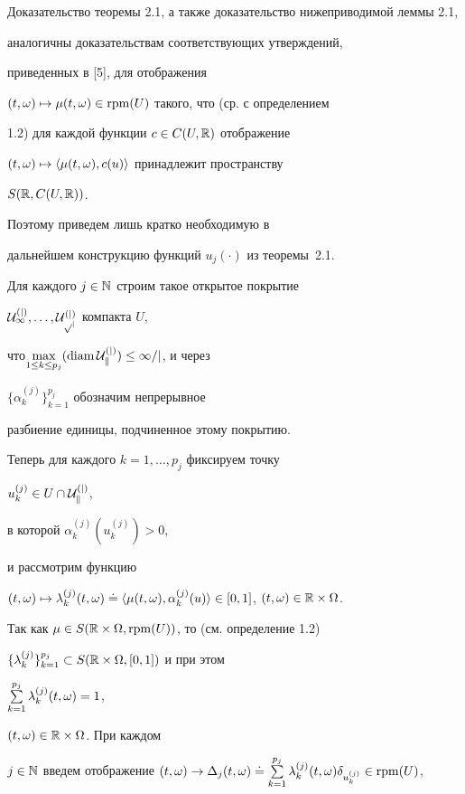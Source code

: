 Доказательство теоремы 2.1, а также доказательство нижеприводимой леммы 2.1,


аналогичны доказательствам соответствующих утверждений,


приведенных в [5], для отображения


$(t,\omega)\mapsto\mu(t,\omega)\in\operatorname{rpm}(U)$ такого, что (ср. с определением


1.2) для каждой функции $c\in C(U,\Bbb R)$ отображение


$(t,\omega)\mapsto\langle\mu(t,\omega),c(u)\rangle$ принадлежит пространству


$S(\Bbb R,C(U,\Bbb R))$.


Поэтому приведем лишь кратко необходимую в


дальнейшем конструкцию функций $u_{j}(\cdot)$ из теоремы~2.1.





Для каждого $j\in \Bbb N$ строим такое открытое покрытие


$\cal U_1^{(j)},\dotsc,\cal U_{p_j}^{(j)}$ компакта $U$,


что\linebreak $\max\limits_{1\le k\le p_j} (\diam


\cal U_k^{(j)})\le 1/j$, и через


$\{\alpha_k^{(j)}\}_{k=1}^{p_j}$ обозначим непрерывное


разбиение единицы, подчиненное этому покрытию.


Теперь для каждого $k=1,\dotsc,p_j$ фиксируем точку


$u_k^{(j)}\in U\cap\cal U_k^{(j)}$,


в которой $\alpha_k^{(j)}(u_k^{(j)})>0$,


и рассмотрим функцию


${(t,\omega)\mapsto\lambda_k^{(j)}\tm\doteq


\la \mu\tm,\alpha_k^{(j)}(u)\ra \in [0,1]}$, ${\tm\in \Bbb R\times\Omega}$.


Так как $\mu\in S(\Bbb R\times\Omega,\operatorname{rpm}(U))$, то (см. определение 1.2)


$\{\lambda_k^{(j)}\}_{k=1}^{p_j}\subset S(\Bbb R\times\Omega,[0,1])$ и при этом


$\sum\limits_{k=1}^{p_j}\lambda_k^{(j)}(t,\omega)=1$,


$(t,\omega)\in \Bbb R\times\Omega$. При каждом


$j\in\Bbb N$ введем отображение $\tm\to\Delta_j \tm\doteq


\sum\limits_{k=1}^{p_j}\lj\tm\delta_{u_k^{(j)}}\in \rpm(U)$,


